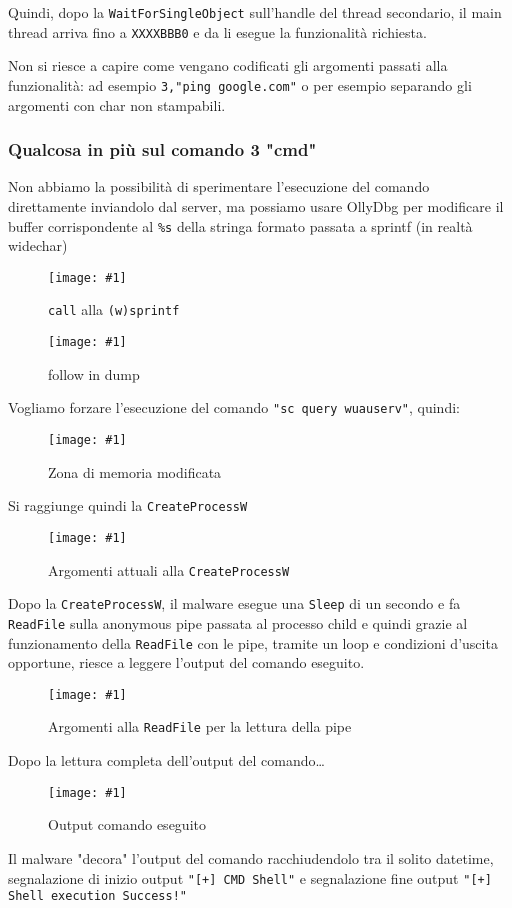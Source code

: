 \documentclass[
    a4paper, %
    11pt %
]{article}
\newcommand{\pic}[4]{\begin{figure}[H]
            \centering
            \texttt{[image: \#1]}
            \caption{#2}
            \label{fig:#1}
            \end{figure}}
\begin{document}
            Quindi, dopo la \texttt{WaitForSingleObject} sull'handle del thread secondario, il main thread
            arriva fino a \texttt{XXXXBBB0} e da li esegue la funzionalità richiesta.

            Non si riesce a capire come vengano codificati gli argomenti passati alla funzionalità: ad esempio
            \texttt{3,"ping google.com"} o per esempio separando gli argomenti con char non stampabili.

            \subsubsection{Qualcosa in più sul comando 3 "cmd"}\label{sect:moreabt3}

            Non abbiamo la possibilità di sperimentare l'esecuzione del comando direttamente inviandolo dal server,
            ma possiamo usare OllyDbg per modificare il buffer corrispondente al \texttt{\%s} della stringa
            formato passata a sprintf (in realtà widechar)

            \pic{chngfmtstr}{\texttt{call} alla \texttt{(w)sprintf}}{18cm}{2cm}

            \pic{chngfmtstr1}{follow in dump}{9cm}{6cm}

            Vogliamo forzare l'esecuzione del comando \texttt{"sc query wuauserv"}, quindi:
            \pic{chngfmtstr2}{Zona di memoria modificata}{6cm}{2cm}

            Si raggiunge quindi la \texttt{CreateProcessW}
            
            \pic{chngfmtstr3}{Argomenti attuali alla \texttt{CreateProcessW}}{10cm}{4cm}

            Dopo la \texttt{CreateProcessW}, il malware esegue una \texttt{Sleep} di un secondo e fa
            \texttt{ReadFile} sulla anonymous pipe passata al processo child e quindi grazie al funzionamento
            della \texttt{ReadFile} con le pipe, tramite un loop e condizioni d'uscita opportune, riesce
            a leggere l'output del comando eseguito.

            \pic{chngfmtstr4}{Argomenti alla \texttt{ReadFile} per la lettura della pipe}{10cm}{4cm}

            Dopo la lettura completa dell'output del comando\dots
            
            \pic{chngfmtstr5}{Output comando eseguito}{9.5cm}{6cm}

            Il malware "decora" l'output del comando racchiudendolo tra il solito datetime, segnalazione di inizio output
            \texttt{"[+] CMD Shell"} e segnalazione fine output \texttt{"[+] Shell execution Success!"}
\end{document}
